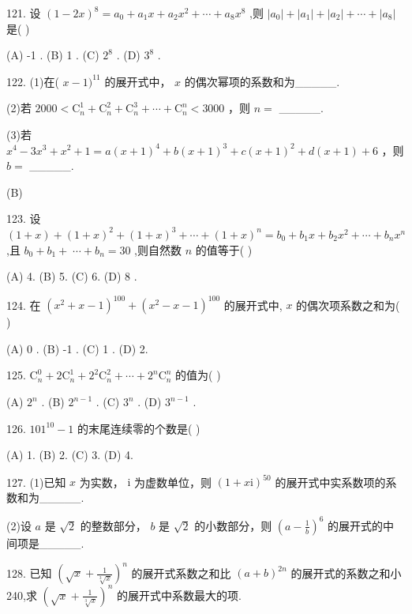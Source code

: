 \documentclass[10pt]{article}
\begin{document}
121. 设 \({\left( 1 - 2x\right) }^{8} = {a}_{0} + {a}_{1}x + {a}_{2}{x}^{2} + \cdots  + {a}_{8}{x}^{8}\) ,则 \(\left| {a}_{0}\right|  + \left| {a}_{1}\right|  + \left| {a}_{2}\right|  + \cdots  + \left| {a}_{8}\right|\) 是(   )

(A) -1 . (B) 1 . (C) \({2}^{8}\) . (D) \({3}^{8}\) .

122. (1)在( \(x - 1{)}^{11}\) 的展开式中， \(x\) 的偶次幂项的系数和为\_\_\_\_\_.

(2)若 \({2000} < {\mathrm{C}}_{n}^{1} + {\mathrm{C}}_{n}^{2} + {\mathrm{C}}_{n}^{3} + \cdots  + {\mathrm{C}}_{n}^{n} < {3000}\) ，则 \(n =\) \_\_\_\_\_.

(3)若 \({x}^{4} - 3{x}^{3} + {x}^{2} + 1 = a{\left( x + 1\right) }^{4} + b{\left( x + 1\right) }^{3} + c{\left( x + 1\right) }^{2} + d\left( {x + 1}\right)  + 6\) ，则 \(b =\) \_\_\_\_\_.

(B)

123. 设 \(\left( {1 + x}\right)  + {\left( 1 + x\right) }^{2} + {\left( 1 + x\right) }^{3} + \cdots  + {\left( 1 + x\right) }^{n} = {b}_{0} + {b}_{1}x + {b}_{2}{x}^{2} + \cdots  + {b}_{n}{x}^{n}\) ,且 \({b}_{0} + {b}_{1} + \; \cdots  + {b}_{n} = {30}\) ,则自然数 \(n\) 的值等于( )

(A) 4. (B) 5. (C) 6. (D) 8 .

124. 在 \({\left( {x}^{2} + x - 1\right) }^{100} + {\left( {x}^{2} - x - 1\right) }^{100}\) 的展开式中, \(x\) 的偶次项系数之和为( )

(A) 0 . (B) -1 . (C) 1 . (D) 2.

125. \({\mathrm{C}}_{n}^{0} + 2{\mathrm{C}}_{n}^{1} + {2}^{2}{\mathrm{C}}_{n}^{2} + \cdots  + {2}^{n}{\mathrm{C}}_{n}^{n}\) 的值为( )

(A) \({2}^{n}\) . (B) \({2}^{n - 1}\) . (C) \({3}^{n}\) . (D) \({3}^{n - 1}\) .

126. \({101}^{10} - 1\) 的末尾连续零的个数是( )

(A) 1. (B) 2. (C) 3. (D) 4.

127. (1)已知 \(x\) 为实数， \(\mathrm{i}\) 为虚数单位，则 \({\left( 1 + x\mathrm{i}\right) }^{50}\) 的展开式中实系数项的系数和为\_\_\_\_\_.

(2)设 \(a\) 是 \(\sqrt{2}\) 的整数部分， \(b\) 是 \(\sqrt{2}\) 的小数部分，则 \({\left( a - \frac{1}{b}\right) }^{6}\) 的展开式的中间项是\_\_\_\_\_.

128. 已知 \({\left( \sqrt{x} + \frac{1}{\sqrt[3]{x}}\right) }^{n}\) 的展开式系数之和比 \({\left( a + b\right) }^{2n}\) 的展开式的系数之和小 240,求 \({\left( \sqrt{x} + \frac{1}{\sqrt[3]{x}}\right) }^{n}\) 的展开式中系数最大的项.
\end{document}
